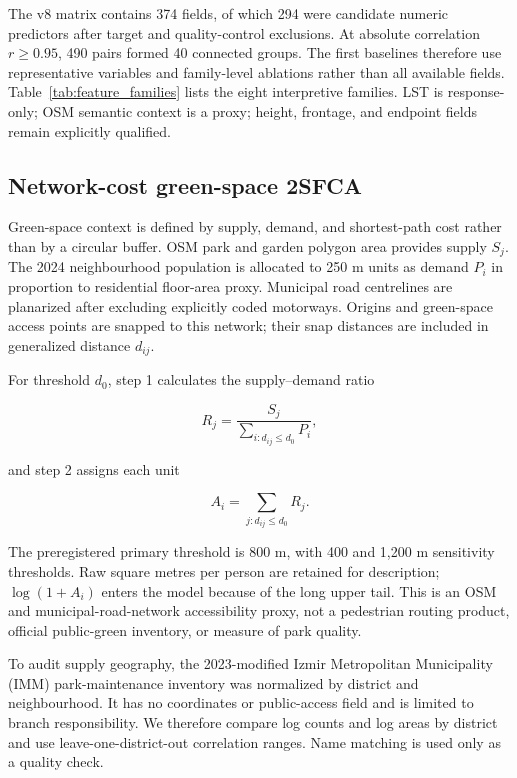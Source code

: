 The v8 matrix contains 374 fields, of which 294 were candidate numeric
predictors after target and quality-control exclusions. At absolute correlation
$r\geq0.95$, 490 pairs formed 40 connected groups. The first baselines therefore
use representative variables and family-level ablations rather than all
available fields. Table~\ref{tab:feature_families} lists the eight interpretive
families. LST is response-only; OSM semantic context is a proxy; height,
frontage, and endpoint fields remain explicitly qualified.



\subsection{Network-cost green-space 2SFCA}

Green-space context is defined by supply, demand, and shortest-path cost rather
than by a circular buffer. OSM park and garden polygon area provides supply
$S_j$. The 2024 neighbourhood population is allocated to 250 m units as demand
$P_i$ in proportion to residential floor-area proxy. Municipal road
centrelines are planarized after excluding explicitly coded motorways. Origins
and green-space access points are snapped to this network; their snap distances
are included in generalized distance $d_{ij}$.

For threshold $d_0$, step 1 calculates the supply--demand ratio

\begin{equation}
R_j = \frac{S_j}{\sum_{i:d_{ij}\leq d_0} P_i},
\end{equation}

and step 2 assigns each unit

\begin{equation}
A_i = \sum_{j:d_{ij}\leq d_0} R_j.
\end{equation}

The preregistered primary threshold is 800 m, with 400 and 1,200 m sensitivity
thresholds. Raw square metres per person are retained for description;
$\log(1+A_i)$ enters the model because of the long upper tail. This is an OSM
and municipal-road-network accessibility proxy, not a pedestrian routing
product, official public-green inventory, or measure of park quality.

To audit supply geography, the 2023-modified Izmir Metropolitan Municipality (IMM) park-maintenance
inventory was normalized by district and neighbourhood. It has no coordinates
or public-access field and is limited to branch responsibility. We therefore
compare log counts and log areas by district and use leave-one-district-out
correlation ranges. Name matching is used only as a quality check.

